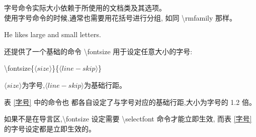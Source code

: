 \documentclass[a4paper]{ctexart}
\begin{document}
    字号命令实际大小依赖于所使用的文档类及其选项。\\
    使用字号命令的时候,通常也需要用花括号进行分组,%
    如同 \textbackslash rmfamily 那样。\par
    He likes {\LARGE large and {\small small} letters}.\par
    还提供了一个基础的命令 \textbackslash fontsize 用于设定任意大小的字号:\par
    \textbackslash fontsize\{$\langle size\rangle$\}\{$\langle line-skip\rangle$\}\par
    $\langle size\rangle$为字号,$\langle line-skip\rangle$为基础行距。\par
    表 \ref{字号} 中的命令也 都各自设定了与字号对应的基础行距,大小为字号的 1.2 倍。\par
    如果不是在导言区,\textbackslash fontsize 设定需要 \textbackslash selectfont 命令才能立即生效,%
    而表 \ref{字号} 的字号设定都是立即生效的。
\end{document}

